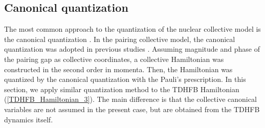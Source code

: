 \documentclass[%
superscriptaddress,
preprint,
showpacs,
nofootinbib,
amsmath,amssymb,
aps,
prc,
floatfix ]%
{revtex4-1}
\begin{document}
\subsection{Canonical quantization}
\label{sec:canonical}

The most common approach to the quantization of the nuclear collective model
is the canonical quantization \cite{BM75}.
In the pairing collective model, the canonical quantization
was adopted in previous studies \cite{BBPK70,delta1,delta3}.
Assuming magnitude and phase of the pairing gap as collective coordinates,
a collective Hamiltonian was constructed in the second order in momenta.
Then, the Hamiltonian was quantized by the canonical quantization
with the Pauli's prescription.
In this section, we apply similar quantization method to
the TDHFB Hamiltonian (\ref{TDHFB_Hamiltonian_3}).
The main difference is that the collective canonical variables are
not assumed in the present case, but are obtained from the TDHFB dynamics
itself.\par


\end{document}
